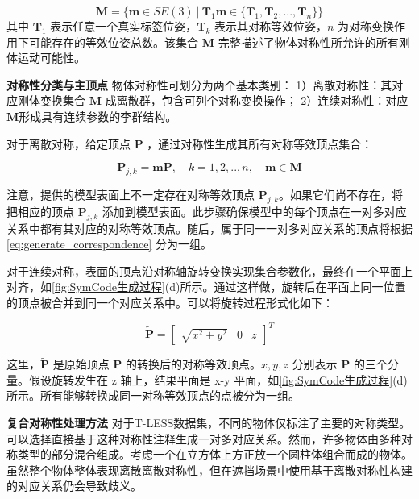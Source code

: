 \begin{equation}
\bm{M} = \{\bm{m}\in SE(3)\ |\ \bm{T}_1  \bm{m} \in \{\bm{T}_1, \bm{T}_2,..., \bm{T}_n\} \}
\label{eq:rigid_motions}
\end{equation}
其中 $\bm{T}_1$ 表示任意一个真实标签位姿，$\bm{T}_k$ 表示其对称等效位姿，$n$ 为对称变换作用下可能存在的等效位姿总数。该集合 $\bm{M}$ 完整描述了物体对称性所允许的所有刚体运动可能性。

\textbf{对称性分类与主顶点 } 物体对称性可划分为两个基本类别：
1）离散对称性：其对应刚体变换集合 $\bm{M}$ 成离散群，包含可列个对称变换操作；
2）连续对称性：对应$\bm{M}$形成具有连续参数的李群结构。

\par 对于离散对称，给定顶点 $\bm{P}$ ，通过对称性生成其所有对称等效顶点集合：

\begin{equation}
\bm{P}_{j,k}=\bm{m} \bm{P},\quad k=1,2,..,n, \quad \bm{m} \in \bm{M}\label{eq:generate_correspondence}
\end{equation}

\par 注意，提供的模型表面上不一定存在对称等效顶点 $\bm{P}_{j,k}$。如果它们尚不存在，将把相应的顶点 $\bm{P}_{j,k}$ 添加到模型表面。此步骤确保模型中的每个顶点在一对多对应关系中都有其对应的对称等效顶点。随后，属于同一一对多对应关系的顶点将根据 \autoref{eq:generate_correspondence} 分为一组。

\par 对于连续对称，表面的顶点沿对称轴旋转变换实现集合参数化，最终在一个平面上对齐，如\autoref{fig:SymCode生成过程}(d)所示。通过这样做，旋转后在平面上同一位置的顶点被合并到同一个对应关系中。可以将旋转过程形式化如下：

\begin{equation}
\tilde{\bm{P}}=
\begin{bmatrix}
 \sqrt{x^2+y^2}  &0 &z
\end{bmatrix}^T
\label{eq:rotation_projection}
\end{equation}

这里，$\tilde{\bm{P}}$ 是原始顶点 $\bm{P}$ 的转换后的对称等效顶点。$x, y, z$ 分别表示 $\bm{P}$ 的三个分量。假设旋转发生在 z 轴上，结果平面是 x-y 平面，如\autoref{fig:SymCode生成过程}(d) 所示。所有能够转换成同一对称等效顶点的点被分为一组。

\textbf{复合对称性处理方法 } 对于T-LESS数据集\cite{tless}，不同的物体仅标注了主要的对称类型。可以选择直接基于这种对称性注释生成一对多对应关系。然而，许多物体由多种对称类型的部分混合组成。考虑一个在立方体上方正放一个圆柱体组合而成的物体。虽然整个物体整体表现离散离散对称性，但在遮挡场景中使用基于离散对称性构建的对应关系仍会导致歧义。

